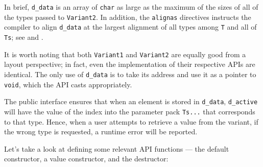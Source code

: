 In brief, \lstinline!d_data! is an array of \lstinline!char! as large as the
maximum of the sizes of all of the types passed to \lstinline!Variant2!. In
addition, the \lstinline!alignas! directives instructs the compiler to
align \lstinline!d_data! at the largest alignment of all types among
\lstinline!T! and all of \lstinline!Ts!; see  and .

It is worth noting that both \lstinline!Variant1! and \lstinline!Variant2! are
equally good from a layout perspective; in fact, even the implementation
of their respective APIs are identical. The only use of \lstinline!d_data!
is to take its address and use it as a pointer to \lstinline!void!, which
the API casts appropriately.

The public interface ensures that when an element is stored in
\lstinline!d_data!, \lstinline!d_active! will have the value of the index
into the parameter pack \lstinline!Ts...! that corresponds to that type.
Hence, when a user attempts to retrieve a value from the variant, if the
wrong type is requested, a runtime error will be reported.

Let's take a look at defining some relevant API functions --- the
default constructor, a value constructor, and the destructor:

